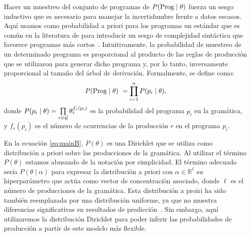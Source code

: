 Hacer un muestreo del conjunto de programas de $P(\Prog \mid \theta)$ fuerza un sesgo inductivo que es necesario para manejar la incertidumbre frente a datos escasos. Aquí usamos como probabilidad a priori para los programas un estándar que es común en la literatura de \lot para introducir un sesgo de complejidad sintáctica que favorece programas más cortos~\cite{goodman2008rational,overlan2017learning}. Intuitivamente, la probabilidad de muestreo de un determinado programa es proporcional al producto de las reglas de producción que se utilizaron para generar dicho programa y, por lo tanto, inversamente proporcional al tamaño del árbol de derivación. Formalmente, se define como:
%
\begin{equation*}
\label{eqC}
P(\Prog \mid \theta)\ = \prod\limits_{i = 1}^n P(p_i \mid \theta),
\end{equation*}
%
donde $P(p_i \mid \theta) = \prod\limits_{r \in \gram} \theta^{f_r(p_i)}_{r}$ es la probabilidad del programa $p_i$ en la gramática, y $f_r(p_i)$ es el número de ocurrencias de la producción $r$ en el programa $p_i$.


En la ecuación \eqref{eq:mainB}, $P(\theta)$ es una Dirichlet que se utiliza como distribución a priori sobre las producciones de la gramática. Al utilizar el término $P(\theta)$ estamos abusando de la notación por simplicidad. El término adecuado sería $P(\theta \mid \alpha)$ para expresar la distribución a priori con $\alpha \in \mathbb{R}^\ell$ su hiperparámetro que actúa como vector de concentración asociado, donde $\ell$ es el número de producciones de la gramática. Esta distribución a proiri ha sido también reemplazada por una distribución uniforme, ya que no muestra diferencias significativas en resultados de predicción~\cite{piantadosi2012bootstrapping,yildirim2015learning}. Sin embargo, aquí utilizaremos la distribución Dirichlet para poder inferir las probabilidades de producción a partir de este modelo más flexible.

